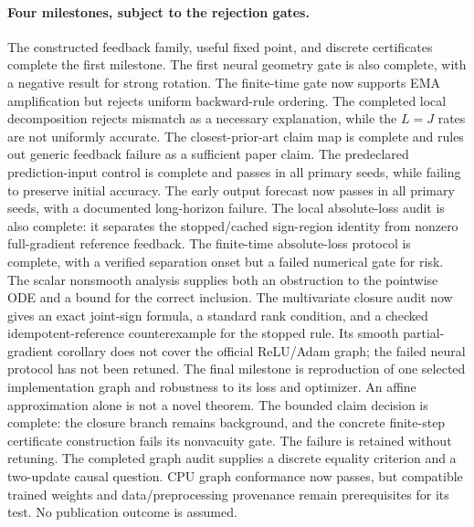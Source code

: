 \documentclass[11pt,a4paper]{article}
\begin{document}
\paragraph{Four milestones, subject to the rejection gates.}
The constructed feedback family, useful fixed point, and discrete
certificates complete the first milestone. The first neural geometry gate
is also complete, with a negative result for strong rotation. The finite-time
gate now supports EMA amplification but rejects uniform backward-rule
ordering. The completed local decomposition rejects mismatch as a
necessary explanation, while the $L=J$ rates are not uniformly
accurate. The closest-prior-art claim map is complete and rules out
generic feedback failure as a sufficient paper claim. The predeclared
prediction-input control is complete and passes in all primary seeds,
while failing to preserve initial accuracy. The early output forecast
now passes in all primary seeds, with a documented long-horizon failure.
The local absolute-loss audit is also complete: it separates the
stopped/cached sign-region identity from nonzero full-gradient reference
feedback. The finite-time absolute-loss protocol is complete, with a
verified separation onset but a failed numerical gate for risk. The
scalar nonsmooth analysis supplies both an obstruction to the pointwise
ODE and a bound for the correct inclusion. The multivariate closure audit
now gives an exact joint-sign formula, a standard rank condition, and
a checked idempotent-reference counterexample for the stopped rule.
Its smooth partial-gradient corollary does not cover the official
ReLU/Adam graph; the failed neural protocol has not been retuned.
The final milestone is reproduction of one selected implementation graph
and robustness to its loss and optimizer. An affine approximation alone is not a novel theorem.
The bounded claim decision is complete: the closure branch remains
background, and the concrete finite-step certificate construction fails
its nonvacuity gate. The failure is retained without retuning. The completed
graph audit supplies a discrete equality criterion and a two-update causal
question. CPU graph conformance now passes, but compatible trained weights
and data/preprocessing provenance remain prerequisites for its test.
No publication outcome is assumed.
\end{document}
